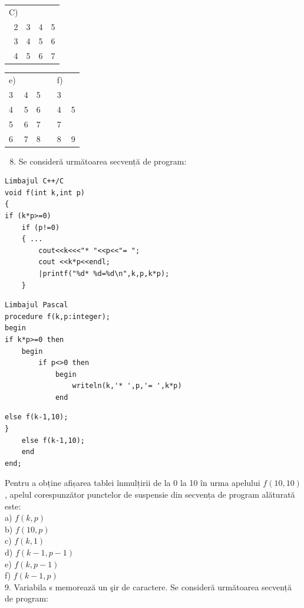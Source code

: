 \documentclass[10pt]{article}
\begin{document}
\begin{center}
\begin{tabular}{rlll}
C) &  &  &  \\
2 & 3 & 4 & 5 \\
3 & 4 & 5 & 6 \\
4 & 5 & 6 & 7 \\
\end{tabular}
\end{center}

\begin{center}
\begin{tabular}{llllll}
e) &  &  &  & f) &  \\
3 & 4 & 5 &  & 3 &  \\
4 & 5 & 6 &  & 4 & 5 \\
5 & 6 & 7 &  & 7 &  \\
6 & 7 & 8 &  & 8 & 9 \\
\end{tabular}
\end{center}

\begin{enumerate}
  \setcounter{enumi}{7}
  \item Se consideră următoarea secvență de program:
\end{enumerate}

\begin{verbatim}
Limbajul C++/C
void f(int k,int p)
{
if (k*p>=0)
    if (p!=0)
    { ...
        cout<<k<<<"* "<<p<<"= ";
        cout <<k*p<<endl;
        |printf("%d* %d=%d\n",k,p,k*p);
    }
\end{verbatim}

\begin{verbatim}
Limbajul Pascal
procedure f(k,p:integer);
begin
if k*p>=0 then
    begin
        if p<>0 then
            begin
                writeln(k,'* ',p,'= ',k*p)
            end
\end{verbatim}

\begin{verbatim}
else f(k-1,10);
}
    else f(k-1,10);
    end
end;
\end{verbatim}

Pentru a obține afișarea tablei înmulțirii de la 0 la 10 în urma apelului $f(10,10)$, apelul corespunzător punctelor de suspensie din secvența de program alăturată este:\\
a) $f(k, p)$\\
b) $f(10, p)$\\
c) $f(k, 1)$\\
d) $f(k-1, p-1)$\\
e) $f(k, p-1)$\\
f) $f(k-1, p)$\\
9. Variabila s memorează un şir de caractere. Se consideră următoarea secvență de program:
\end{document}
